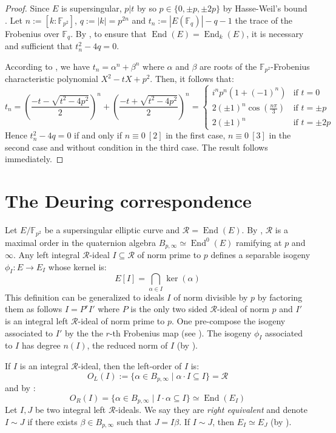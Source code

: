 \documentclass[a4paper,10pt]{report}
\theoremstyle{definition}
\theoremstyle{plain}
\theoremstyle{definition}
\newcommand{\F}{\mathbb{F}}
\newcommand{\m}[1]{\mathcal{#1}}
\renewcommand{\(}{\left(}
\renewcommand{\)}{\right)}
\DeclareMathOperator{\End}{End}
\begin{document}
\begin{proof}
Since $E$ is supersingular,  $p|t$ by \cite[theorem V.4.1.a]{Silverman1} so $p\in\{0,\pm p, \pm 2p\}$ by Hasse-Weil's bound \cite[theorem V.1.1]{Silverman1}.  Let $n:=[k:\F_{p^2}]$, $q:=|k|=p^{2n}$ and $t_n:=|E(\F_{q})|-q-1$ the trace of the Frobenius over $\F_q$.  By \cite[theorem 4.1]{Waterhouse1969},  to ensure that $\End(E)=\End_k(E)$,  it is necessary and sufficient that $t_n^2-4q=0$. 

According to \cite[theorem V.2.3.1.a]{Silverman1},  we have $t_n=\alpha^n+\beta^n$ where $\alpha$ and $\beta$ are roots of the $\F_{p^2}$-Frobenius characteristic polynomial $X^2-tX+p^2$.  Then,  it follows that:
\[t_n=\(\frac{-t-\sqrt{t^2-4p^2}}{2}\)^n+\(\frac{-t+\sqrt{t^2-4p^2}}{2}\)^n=\left\{
\begin{array}{cl}
i^np^n(1+(-1)^n) & \mbox{if } t=0\\
2(\pm 1)^n\cos\(\frac{n\pi}{3}\)& \mbox{if } t=\pm p\\
2(\pm 1)^n & \mbox{if } t=\pm 2p 
\end{array}
\right.\]
Hence $t_n^2-4q=0$ if and only if $n\equiv 0 \ [2]$ in the first case,  $n\equiv 0 \ [3]$ in the second case and without condition in the third case.  The result follows immediately.
\end{proof}

\section{The Deuring correspondence}\label{paragraph 2}

Let $E/\F_{p^2}$ be a supersingular elliptic curve and $\m{R}=\End(E)$.  By \cite[theorem 42.1.9]{Voight}, $\m{R}$ is a maximal order in the quaternion algebra $B_{p,\infty}\simeq\End^0(E)$ ramifying at $p$ and $\infty$. Any left integral $\m{R}$-ideal $I\subseteq \m{R}$ of norm prime to $p$ defines a separable isogeny $\phi_I : E\longrightarrow E_I$ whose kernel is:
\[E[I]=\bigcap_{\alpha\in I}\ker(\alpha)\]
This definition can be generalized to ideals $I$ of norm divisible by $p$ by factoring them as follows $I=P^r I'$ where $P$ is the only two sided $\m{R}$-ideal of norm $p$ and $I'$ is an integral left $\m{R}$-ideal of norm prime to $p$.  One pre-compose the isogeny associated to $I'$ by the the $r$-th Frobenius map (see \cite[42.2.4]{Voight}).  The isogeny $\phi_I$ associated to $I$ has degree $n(I)$, the reduced norm of $I$ (by \cite[proposition 42.2.16.(a)]{Voight}).

If $I$ is an integral $\m{R}$-ideal, then the left-order of $I$ is: 
\[O_L(I):=\{\alpha\in B_{p,\infty}\mid \alpha\cdot I \subseteq I\}=\m{R}\]
and by \cite[lemma 42.2.9]{Voight}:
\[O_R(I)=\{\alpha\in B_{p,\infty}\mid I\cdot\alpha \subseteq I\}\simeq \End(E_I)\]
Let $I, J$ be two integral left $\m{R}$-ideals. We say they are \emph{right equivalent} and denote $I\sim J$ if there exists $\beta\in B_{p,\infty}$ such that $J=I\beta$. If $I\sim J$, then $E_I\simeq E_J$ (by \cite[lemma 42.2.13]{Voight}).
\end{document}

